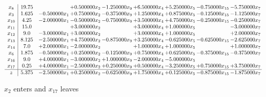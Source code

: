 \documentclass[10pt]{article}
\begin{document}
 \[\begin{array}{c| c c@{\hskip 2pt} c@{\hskip 2pt} c@{\hskip 2pt} c@{\hskip 2pt} c@{\hskip 2pt} c@{\hskip 2pt} c@{\hskip 2pt} }
 x_{8}   &  19.75  &   & + 0.500000 x_{2} & -1.250000 x_{9} & + 6.500000 x_{4} & + 5.250000 x_{5} & -0.750000 x_{15} & -5.750000 x_{7}\\
 x_{3}   &  1.625 & -0.500000 x_{1} & + 0.750000 x_{2} & -0.375000 x_{9} & + 1.250000 x_{4} & + 0.875000 x_{5} & -0.125000 x_{15} & -1.125000 x_{7}\\
 x_{10}   &  4.25 & -2.000000 x_{1} & -0.500000 x_{2} & -0.750000 x_{9} & + 3.500000 x_{4} & + 4.750000 x_{5} & -0.250000 x_{15} & -0.250000 x_{7}\\
 x_{11}   &  15.0  &   & + 3.000000 x_{2} &   & + 3.000000 x_{4} & + 1.000000 x_{5} &   & -3.000000 x_{7}\\
 x_{12}   &  9.0 & -3.000000 x_{1} & + 3.000000 x_{2} &   & + 3.000000 x_{4} & + 1.000000 x_{5} &   & + 2.000000 x_{7}\\
 x_{13}   &  8.125 & -2.500000 x_{1} & + 4.750000 x_{2} & -0.875000 x_{9} & + 3.250000 x_{4} & -0.625000 x_{5} & -0.625000 x_{15} & -2.625000 x_{7}\\
 x_{14}   &  7.0 & + 2.000000 x_{1} & -2.000000 x_{2} &   & + 1.000000 x_{4} & + 1.000000 x_{5} &   & + 1.000000 x_{7}\\
 x_{6}   &  1.875 & -0.500000 x_{1} & + 0.250000 x_{2} & -0.125000 x_{9} & + 0.750000 x_{4} & + 0.625000 x_{5} & -0.375000 x_{15} & -0.375000 x_{7}\\
 x_{16}   &  9.0 & + 4.000000 x_{1} & -3.000000 x_{2} & + 1.000000 x_{9} & -2.000000 x_{4} & -5.000000 x_{5} &    &   \\
 x_{17}   &  0.25 & + 4.000000 x_{1} & -2.500000 x_{2} & + 0.250000 x_{9} & + 0.500000 x_{4} & -3.250000 x_{5} & + 0.750000 x_{15} & + 3.750000 x_{7}\\
\hline
z    &  5.375 & -2.500000 x_{1} & + 0.250000 x_{2} & -0.625000 x_{9} & + 1.750000 x_{4} & + 0.125000 x_{5} & -0.875000 x_{15} & -1.875000 x_{7}\\
\end{array}\]


 $ x_{2} $ enters and $ x_{17} $ leaves 
\end{document}
